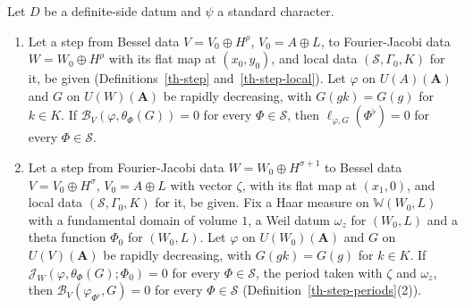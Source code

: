 \begin{proposition}\label{th-vanishing-descends}
Let $D$ be a definite-side datum and $\psi$ a standard character.
\begin{enumerate}
\item Let a step from Bessel data $V=V_0\oplus H^\rho$, $V_0=A\oplus L$, to
  Fourier-Jacobi data $W=W_0\oplus H^\rho$ with its flat map at $(x_0,y_0)$, and
  local data $(\mathcal S,\Gamma_0,K)$ for it, be given
  (Definitions~\ref{th-step} and~\ref{th-step-local}). Let $\varphi$ on
  $U(A)(\mathbf A)$ and $G$ on $U(W)(\mathbf A)$ be rapidly decreasing, with
  $G(gk)=G(g)$ for $k\in K$. If $\mathcal B_V(\varphi,\theta_\Phi(G))=0$ for
  every $\Phi\in\mathcal S$, then $\ell_{\varphi,G}(\Phi^\flat)=0$ for every
  $\Phi\in\mathcal S$.
\item Let a step from Fourier-Jacobi data $W=W_0\oplus H^{\sigma+1}$ to Bessel
  data $V=V_0\oplus H^\sigma$, $V_0=A\oplus L$ with vector $\zeta$, with its flat
  map at $(x_1,0)$, and local data $(\mathcal S,\Gamma_0,K)$ for it, be given.
  Fix a Haar measure on $\mathbb W(W_0,L)$ with a fundamental domain of volume
  $1$, a Weil datum $\omega_z$ for $(W_0,L)$ and a theta function $\Phi_0$ for
  $(W_0,L)$. Let $\varphi$ on $U(W_0)(\mathbf A)$ and $G$ on $U(V)(\mathbf A)$
  be rapidly decreasing, with $G(gk)=G(g)$ for $k\in K$. If
  $\mathcal J_W(\varphi,\theta_\Phi(G);\Phi_0)=0$ for every $\Phi\in\mathcal S$,
  the period taken with $\zeta$ and $\omega_z$, then
  $\mathcal B_V(\varphi_{\Phi^\flat},G)=0$ for every $\Phi\in\mathcal S$
  (Definition~\ref{th-step-periods}(2)).
\end{enumerate}
\end{proposition}
